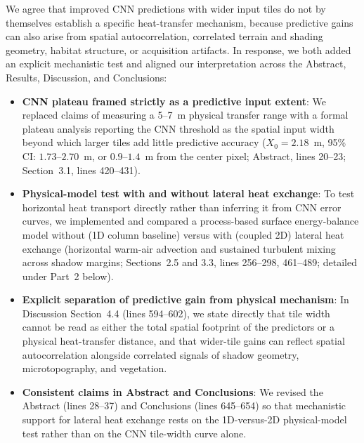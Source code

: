 \documentclass[12pt,english]{reviewresponse}
\begin{document}
\begin{revresponse}
We agree that improved CNN predictions with wider input tiles do not by themselves establish a specific heat-transfer mechanism, because predictive gains can also arise from spatial autocorrelation, correlated terrain and shading geometry, habitat structure, or acquisition artifacts. In response, we both added an explicit mechanistic test and aligned our interpretation across the Abstract, Results, Discussion, and Conclusions:
\begin{itemize}[leftmargin=*, itemsep=0.2em]
    \item \textbf{CNN plateau framed strictly as a predictive input extent}: We replaced claims of measuring a 5--7~m physical transfer range with a formal plateau analysis reporting the CNN threshold as the spatial input width beyond which larger tiles add little predictive accuracy ($X_0 = 2.18$~m, 95\% CI: $1.73\text{--}2.70$~m, or $0.9\text{--}1.4$~m from the center pixel; Abstract, lines 20--23; Section~3.1, lines 420--431).
    \item \textbf{Physical-model test with and without lateral heat exchange}: To test horizontal heat transport directly rather than inferring it from CNN error curves, we implemented and compared a process-based surface energy-balance model without (1D column baseline) versus with (coupled 2D) lateral heat exchange (horizontal warm-air advection and sustained turbulent mixing across shadow margins; Sections~2.5 and 3.3, lines 256--298, 461--489; detailed under Part~2 below).
    \item \textbf{Explicit separation of predictive gain from physical mechanism}: In Discussion Section~4.4 (lines 594--602), we state directly that tile width cannot be read as either the total spatial footprint of the predictors or a physical heat-transfer distance, and that wider-tile gains can reflect spatial autocorrelation alongside correlated signals of shadow geometry, microtopography, and vegetation.
    \item \textbf{Consistent claims in Abstract and Conclusions}: We revised the Abstract (lines 28--37) and Conclusions (lines 645--654) so that mechanistic support for lateral heat exchange rests on the 1D-versus-2D physical-model test rather than on the CNN tile-width curve alone.
\end{itemize}
\end{revresponse}
\end{document}
